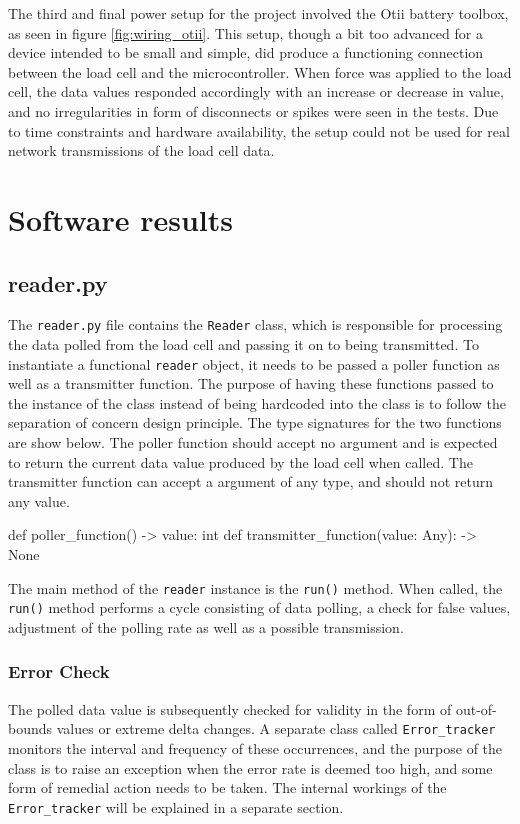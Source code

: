 The third and final power setup for the project involved the Otii battery toolbox, as seen in figure \ref{fig:wiring_otii}. This setup, though a bit too advanced for a device intended to be small and simple, did produce a functioning connection between the load cell and the microcontroller. When force was applied to the load cell, the data values responded accordingly with an increase or decrease in value, and no irregularities in form of disconnects or spikes were seen in the tests. Due to time constraints and hardware availability, the setup could not be used for real network transmissions of the load cell data.

\section{Software results}

\subsection{reader.py}
The \lstinline{reader.py} file contains the \lstinline{Reader} class, which is responsible for processing the data polled from the load cell and passing it on to being transmitted. To instantiate a functional \lstinline{reader} object, it needs to be passed a poller function as well as a transmitter function. The purpose of having these functions passed to the instance of the class instead of being hardcoded into the class is to follow the separation of concern design principle.\cite{sep-concern} The type signatures for the two functions are show below. The poller function should accept no argument and is expected to return the current data value produced by the load cell when called. The transmitter function can accept a argument of any type, and should not return any value.
\begin{Code}
	def poller_function() -> value: int
	def transmitter_function(value: Any): -> None
\end{Code}


The main method of the \lstinline{reader} instance is the \lstinline{run()} method. When called, the \lstinline{run()} method performs a cycle consisting of data polling, a check for false values, adjustment of the polling rate as well as a possible transmission. 

\subsubsection{Error Check}
The polled data value is subsequently checked for validity in the form of out-of-bounds values or extreme delta changes. A separate class called \lstinline{Error_tracker} monitors the interval and frequency of these occurrences, and the purpose of the class is to raise an exception when the error rate is deemed too high, and some form of remedial action needs to be taken. The internal workings of the \lstinline{Error_tracker} will be explained in a separate section.

